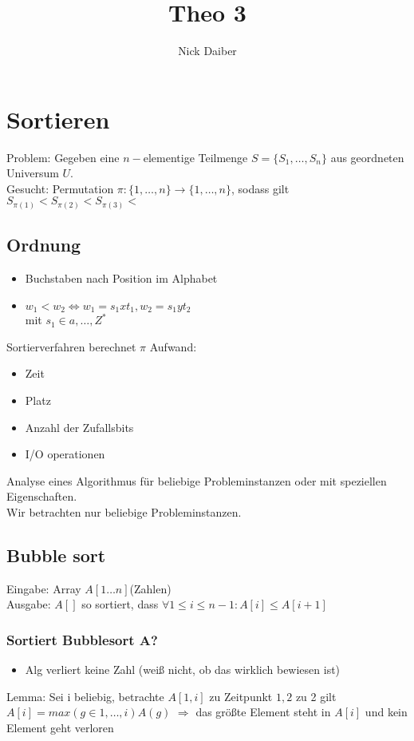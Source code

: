 \documentclass{article}
\title{Theo 3}
\author{Nick Daiber}
\begin{document}
\maketitle
\section{Sortieren}
Problem: Gegeben eine $n-$elementige Teilmenge $S = \{S_1, \hdots, S_n\}$ aus geordneten
Universum $U$.\\
Gesucht: Permutation $\pi: \{1, \hdots, n\} \rightarrow \{1, \hdots, n\}$, sodass gilt
$S_{\pi(1)}<S_{\pi(2)}<S_{\pi(3)}<$
\subsection{Ordnung}
\begin{itemize}
	\item{Buchstaben nach Position im Alphabet}
	\item{$w_1<w_2 \Leftrightarrow w_1 = s_1 x t_1, w_2=s_1 y t_2$\\
		mit $s_1 \in {a, \hdots, Z}^*$}
\end{itemize}

Sortierverfahren berechnet $\pi$
Aufwand:
\begin{itemize}
	\item{Zeit}
	\item{Platz}
	\item{Anzahl der Zufallsbits}
	\item{I/O operationen}
\end{itemize}

Analyse eines Algorithmus für beliebige Probleminstanzen oder mit speziellen Eigenschaften.\\
Wir betrachten nur beliebige Probleminstanzen.

\subsection{Bubble sort}
Eingabe: Array $A[1\hdots n]$(Zahlen)\\
Ausgabe: $A[]$ so sortiert, dass $\forall 1 \leq i \leq n-1 : A[i] \leq A[i+1]$
\subsubsection{ Sortiert Bubblesort A?}
\begin{itemize}
	\item{Alg verliert keine Zahl (weiß nicht, ob das wirklich bewiesen ist)}
\end{itemize}
Lemma: Sei i beliebig, betrachte $A[1, i]$ zu Zeitpunkt $1, 2$ 
zu 2 gilt $A[i] = max(g\in{1,\hdots,i}) A(g)$
$\Rightarrow$ das größte Element steht in $A[i]$ und kein Element geht verloren
\end{document}
